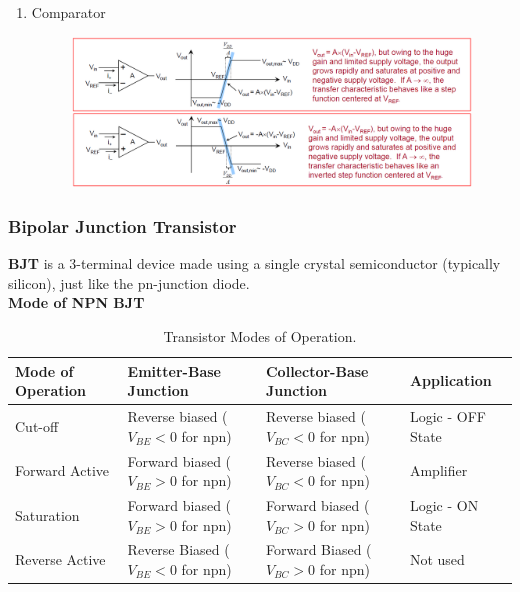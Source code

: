 \begin{enumerate}
\begin{figure}[!h]
    \end{figure}
    \item Comparator
    \begin{figure}[!h]
        \centering
        \includegraphics[width=0.75\linewidth]{image/comparator.png}
    \end{figure}    
\end{enumerate}

\newpage 
\subsubsection{Bipolar Junction Transistor}
\textbf{BJT} is a 3-terminal device made using a single crystal semiconductor (typically silicon), just like the pn-junction diode. \\
\textbf{Mode of NPN BJT}
\begin{table}[ht]
\centering
\caption{Transistor Modes of Operation.}
\label{table:transistor_modes}
\small %
\begin{tabularx}{\textwidth}{|X|X|X|X|}
\hline
\textbf{Mode of Operation} & \textbf{Emitter-Base Junction} & \textbf{Collector-Base Junction} & \textbf{Application} \\
\hline
Cut-off & Reverse biased (\( V_{BE} < 0 \) for npn) & Reverse biased (\( V_{BC} < 0 \) for npn) & Logic - OFF State \\
\hline
Forward Active & Forward biased (\( V_{BE} > 0 \) for npn) & Reverse biased (\( V_{BC} < 0 \) for npn) & Amplifier \\
\hline
Saturation & Forward biased (\( V_{BE} > 0 \) for npn) & Forward biased (\( V_{BC} > 0 \) for npn) & Logic - ON State \\
\hline
Reverse Active & Reverse Biased (\( V_{BE} < 0 \) for npn) & Forward Biased (\( V_{BC} > 0 \) for npn) & Not used \\
\hline
\end{tabularx}
\end{table}
